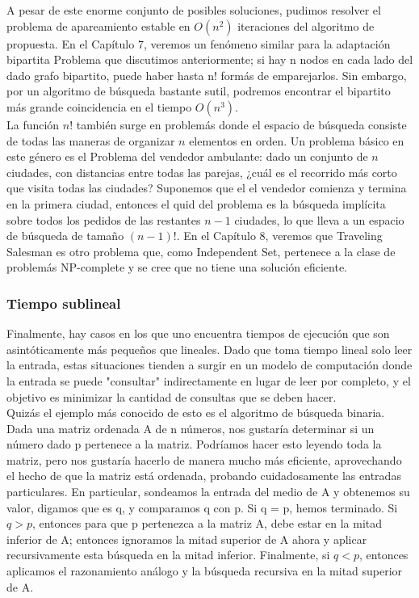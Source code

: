 \documentclass[a4paper]{article}
\begin{document}
A pesar de este enorme conjunto de posibles soluciones, pudimos resolver el problema de apareamiento estable en $O(n^2)$ iteraciones del algoritmo de propuesta.
En el Capítulo 7, veremos un fenómeno similar para la adaptación bipartita Problema que discutimos anteriormente; si hay n nodos en cada lado del dado grafo bipartito, puede haber hasta n! formás de emparejarlos. Sin embargo, por un algoritmo de búsqueda bastante sutil, podremos encontrar el bipartito más grande coincidencia en el tiempo $O(n^3)$.\\

La función $n!$ también surge en problemás donde el espacio de búsqueda consiste
de todas las maneras de organizar $n$ elementos en orden. Un problema básico en este género es el Problema del vendedor ambulante: dado un conjunto de $n$ ciudades, con distancias entre todas las parejas, ¿cuál es el recorrido más corto que visita todas las ciudades? Suponemos que el el vendedor comienza y termina en la primera ciudad, entonces el quid del problema es la búsqueda implícita sobre todos los pedidos de las restantes $n-1$ ciudades, lo que lleva a un espacio de búsqueda de tamaño $(n-1)!$. En el Capítulo 8, veremos que Traveling Salesman es otro problema que, como Independent Set, pertenece a la clase de problemás NP-complete y se cree que no tiene una solución
eficiente.\\

\subsubsection*{Tiempo sublineal}

Finalmente, hay casos en los que uno encuentra tiempos de ejecución que son asintóticamente más
pequeños que lineales. Dado que toma tiempo lineal solo leer la entrada, estas situaciones tienden a
surgir en un modelo de computación donde la entrada se puede "consultar" indirectamente en lugar de
leer por completo, y el objetivo es minimizar la cantidad de consultas que se deben hacer.\\

Quizás el ejemplo más conocido de esto es el algoritmo de búsqueda binaria. Dada una matriz
ordenada A de n números, nos gustaría determinar si un número dado p pertenece a la matriz.
Podríamos hacer esto leyendo toda la matriz, pero nos gustaría hacerlo de manera mucho más
eficiente, aprovechando el hecho de que la matriz está ordenada, probando cuidadosamente las
entradas particulares. En particular, sondeamos la entrada del medio de A y obtenemos su valor,
digamos que es q, y comparamos q con p. Si q = p, hemos terminado. Si $q>p$, entonces para que p
pertenezca a la matriz A, debe estar en la mitad inferior de A; entonces ignoramos la mitad superior de
A
ahora y aplicar recursivamente esta búsqueda en la mitad inferior. Finalmente, si $q<p$, entonces
aplicamos el razonamiento análogo y la búsqueda recursiva en la mitad superior de A.\\
\end{document}
